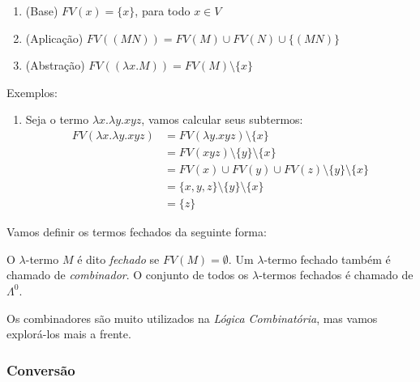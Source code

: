 \documentclass[../main.tex]{subfiles}
\begin{document}
\begin{definition}
    \hfill
    \begin{enumerate}
        \item (Base) $FV(x) = \{x\}$, para todo $x \in V$
        \item (Aplicação) $FV((M N)) = FV(M) \cup FV(N) \cup \{ (M N) \}$
        \item (Abstração) $FV((\lambda x . M)) = FV(M) \setminus \{x\}$
    \end{enumerate}

\end{definition}

Exemplos:

\begin{enumerate}
    \item Seja o termo $\lambda x . \lambda y . xyz$, vamos calcular seus subtermos:
    \begin{equation*}
        \begin{split}
            FV(\lambda x . \lambda y . xyz) & = FV(\lambda y . xyz) \setminus \{x\} 
                                         \\ & = FV(xyz) \setminus \{y\} \setminus \{x\}
                                         \\ & = FV(x) \cup FV(y) \cup FV(z) \setminus \{y\}  \setminus \{x\} 
                                         \\ & = \{x, y, z\} \setminus \{y\}  \setminus \{x\}
                                         \\ & = \{z\}
        \end{split}
    \end{equation*}
\end{enumerate}

Vamos definir os termos fechados da seguinte forma:

\begin{definition}
    O $\lambda$-termo $M$ é dito \emph{fechado} se $FV(M) = \emptyset$. Um $\lambda$-termo fechado também é chamado de \emph{combinador}. O conjunto de todos os $\lambda$-termos fechados é chamado de $\Lambda^0$.
\end{definition}

Os combinadores são muito utilizados na \emph{Lógica Combinatória}, mas vamos explorá-los mais a frente.

\subsubsection{Conversão}
\end{document}
